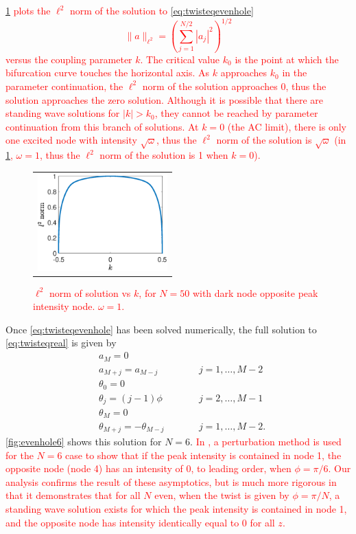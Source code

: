 \documentclass[reprint, amsmath,amssymb,aps,pra]{revtex4-2}
\renewcommand{\revised}[1]{ \textcolor{red}{#1} }
\begin{document}
\revised{
\cref{fig:evenbif} plots the $\ell^2$ norm of the solution to \cref{eq:twisteqevenhole}
\begin{equation}
\| a \|_{\ell^2} = \left( \sum_{j=1}^{N/2} |a_j|^2 \right)^{1/2}
\end{equation}
 versus the coupling parameter $k$. The critical value $k_0$ is the point at which the bifurcation curve touches the horizontal axis. As $k$ approaches $k_0$ in the parameter continuation, the $\ell^2$ norm of the solution approaches 0, thus the solution approaches the zero solution. Although it is possible that there are standing wave solutions for $|k| > k_0$, they cannot be reached by parameter continuation from this branch of solutions. At $k = 0$ (the AC limit), there is only one excited node with intensity $\sqrt{\omega}$, thus the $\ell^2$ norm of the solution is $\sqrt{\omega}$ (in \cref{fig:evenbif}, $\omega = 1$, thus the $\ell^2$ norm of the solution is 1 when $k = 0$).
\begin{figure}
\begin{center}
\begin{tabular}{c}
\includegraphics[width=5cm]{evenbif50.eps} 
\end{tabular}
\end{center}
\caption{$\ell^2$ norm of solution vs $k$, for $N = 50$ with dark node opposite peak intensity node. $\omega = 1$.}
\label{fig:evenbif}
\end{figure}
}

Once \cref{eq:twisteqevenhole} has been solved numerically, the full solution to \cref{eq:twisteqreal} is given by
\begin{align*}
&a_M = 0 \\
&a_{M+j} = a_{M-j} && \qquad j = 1, \dots, M-2 \\
&\theta_0 = 0 \\
&\theta_j = (j-1)\phi && \qquad  j = 2, \dots, M-1 \\
&\theta_M = 0 \\
&\theta_{M+j} = -\theta_{M-j} && \qquad j = 1, \dots, M-2.
\end{align*}
\cref{fig:evenhole6} shows this solution for $N=6$. \revised{In \cite{castro2016}, a perturbation method is used for the $N=6$ case to show that if the peak intensity is contained in node 1, the opposite node (node 4) has an intensity of 0, to leading order, when $\phi=\pi/6$. Our analysis confirms the result of these asymptotics, but is much more rigorous in that it demonstrates that for all $N$ even, when the twist is given by $\phi = \pi/N$, a standing wave solution exists for which the peak intensity is contained in node 1, and the opposite node has intensity identically equal to 0 for all $z$. }
\end{document}
